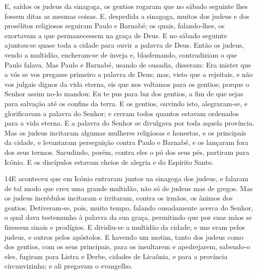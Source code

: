 E, saídos os judeus da sinagoga, os gentios rogaram que no sábado
seguinte lhes fossem ditas as mesmas coisas. E, despedida a
sinagoga, muitos dos judeus e dos prosélitos religiosos seguiram
Paulo e Barnabé; os quais, falando-lhes, os exortavam a que
permanecessem na graça de Deus. E no sábado seguinte
ajuntou-se quase toda a cidade para ouvir a palavra de Deus.
Então os judeus, vendo a multidão, encheram-se de inveja e,
blasfemando, contradiziam o que Paulo falava. Mas Paulo e
Barnabé, usando de ousadia, disseram: Era mister que a vós se vos
pregasse primeiro a palavra de Deus; mas, visto que a rejeitais, e
não vos julgais dignos da vida eterna, eis que nos voltamos para os
gentios; porque o Senhor assim no-lo mandou: Eu te pus para
luz dos gentios, a fim de que sejas para salvação até os confins da
terra. E os gentios, ouvindo isto, alegraram-se, e
glorificavam a palavra do Senhor; e creram todos quantos estavam
ordenados para a vida eterna. E a palavra do Senhor se
divulgava por toda aquela província. Mas os judeus incitaram
algumas mulheres religiosas e honestas, e os principais da cidade, e
levantaram perseguição contra Paulo e Barnabé, e os lançaram fora
dos seus termos. Sacudindo, porém, contra eles o pó dos seus
pés, partiram para Icônio. E os discípulos estavam cheios de
alegria e do Espírito Santo.

\medskip

\lettrine{14} E aconteceu que em Icônio entraram juntos na
sinagoga dos judeus, e falaram de tal modo que creu uma grande
multidão, não só de judeus mas de gregos. Mas os judeus
incrédulos incitaram e irritaram, contra os irmãos, os ânimos dos
gentios. Detiveram-se, pois, muito tempo, falando ousadamente
acerca do Senhor, o qual dava testemunho à palavra da sua graça,
permitindo que por suas mãos se fizessem sinais e prodígios. E
dividiu-se a multidão da cidade; e uns eram pelos judeus, e outros
pelos apóstolos. E havendo um motim, tanto dos judeus como dos
gentios, com os seus principais, para os insultarem e apedrejarem,
sabendo-o eles, fugiram para Listra e Derbe, cidades de
Licaônia, e para a província circunvizinha; e ali pregavam o
evangelho.


